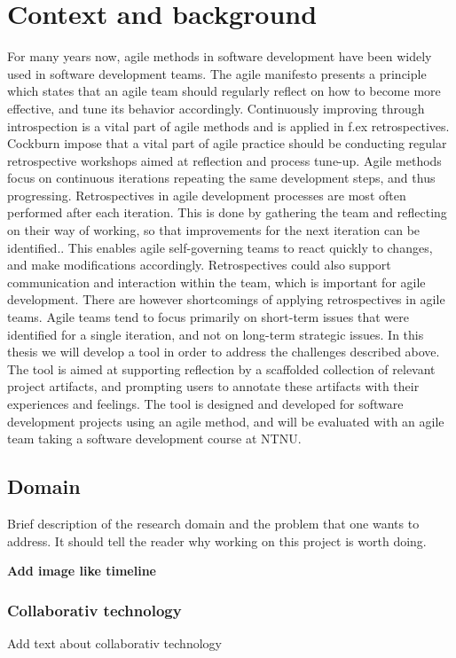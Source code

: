\section{Context and background}
For many years now, agile methods in software development have been widely used in software development teams. The agile manifesto presents a principle which states that an agile team should regularly reflect on how to become more effective, and tune its behavior accordingly\cite{Beck2001}. Continuously improving through introspection is a vital part of agile methods and is applied in f.ex retrospectives\cite{Beck1999, Derby2006, Maham2008}. Cockburn impose that a vital part of agile practice should be conducting regular retrospective workshops aimed at reflection and process tune-up\cite{Cockburn2006}. Agile methods focus on continuous iterations repeating the same development steps, and thus progressing. Retrospectives in agile development processes are most often performed after each iteration. This is done by gathering the team and reflecting on their way of working, so that improvements for the next iteration can be identified.\cite{Derby2006, Drury2011}. This enables agile self-governing teams to react quickly to changes, and make modifications accordingly\cite{Drury2011}. Retrospectives could also support communication and interaction within the team, which is important for agile development. There are however shortcomings of applying retrospectives in agile teams. Agile teams tend to focus primarily on short-term issues that were identified for a single iteration, and not on long-term strategic issues\cite{Drury2011}. 
In this thesis we will develop a tool in order to address the challenges described above. The tool is aimed at supporting reflection by a scaffolded collection of relevant project artifacts, and prompting users to annotate these artifacts with their experiences and feelings. The tool is designed and developed for software development projects using an agile method, and will be evaluated with an agile team taking a software development course at NTNU. 

\subsection{Domain}
Brief description of the research domain and the problem that one
wants to address. It should tell the reader why working on this project is worth
doing.

\textbf{Add image like timeline}

\subsubsection{Collaborativ technology}
Add text about collaborativ technology

